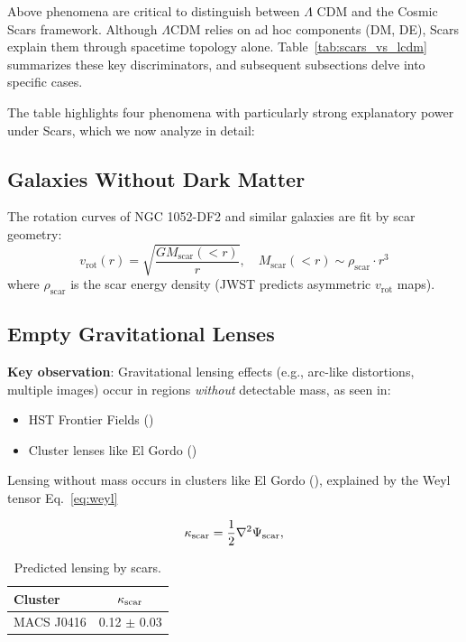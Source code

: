 \documentclass{article}
\begin{document}
Above phenomena are critical to distinguish between $\Lambda$ CDM and the Cosmic Scars framework. Although $\Lambda$CDM relies on ad hoc components (DM, DE), Scars explain them through spacetime topology alone. Table~\ref{tab:scars_vs_lcdm} summarizes these key discriminators, and subsequent subsections delve into specific cases.

The table highlights four phenomena with particularly strong explanatory power under Scars, which we now analyze in detail:

\subsection{Galaxies Without Dark Matter}
The rotation curves of NGC 1052-DF2 and similar galaxies are fit by scar geometry:
\FloatBarrier
\begin{equation}
    v_{\text{rot}}(r) = \sqrt{\frac{G M_{\text{scar}}(<r)}{r}}, \quad M_{\text{scar}}(<r) \sim \rho_{\text{scar}} \cdot r^3
\end{equation}
where $\rho_{\text{scar}}$ is the scar energy density (JWST predicts asymmetric $v_{\text{rot}}$ maps).



\subsection{Empty Gravitational Lenses}  
\label{subsec:empty_lenses}  


\textbf{Key observation}:  
Gravitational lensing effects (e.g., arc-like distortions, multiple images) occur in regions \textit{without} detectable mass, as seen in:  
\begin{itemize}  
    \item HST Frontier Fields (\cite{Meneghetti2020})  
    \item Cluster lenses like El Gordo (\cite{Meneghetti2023})  
\end{itemize}  
Lensing without mass occurs in clusters like El Gordo (\cite{Meneghetti2020}), explained by the Weyl tensor Eq.~\ref{eq:weyl}



\begin{equation}  
\kappa_{\rm scar} = \frac{1}{2} \nabla^2 \Psi_{\rm scar},  
\label{eq:lensing_potential}  
\end{equation}  

\begin{table}[H]  
    \centering  
    \begin{tabular}{lc}  
        \hline  
        \textbf{Cluster} & $\kappa_{\rm scar}$ \\  
        \hline  
        MACS J0416 & 0.12 $\pm$ 0.03 \\  
        \hline  
    \end{tabular}  
    \caption{Predicted lensing by scars.}  
    \label{tab:lensing}  
\end{table}  
\end{document}
